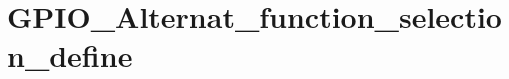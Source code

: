 \hypertarget{group___g_p_i_o___alternat__function__selection__define}{\section{G\-P\-I\-O\-\_\-\-Alternat\-\_\-function\-\_\-selection\-\_\-define}
\label{group___g_p_i_o___alternat__function__selection__define}
}
